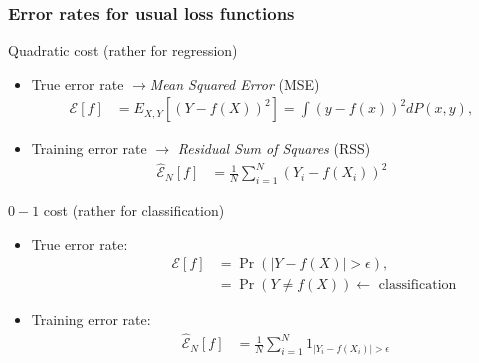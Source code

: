 \documentclass[compress, smaller, serif, 9pt]{beamer}
\begin{document}
\begin{frame}
  \frametitle{Error rates for usual loss functions}
  \begin{block}{Quadratic cost (rather for regression)}
   \begin{itemize}
   \item True error rate  $\rightarrow${\it Mean Squared Error} (MSE)
   \begin{align*}
    \mathcal{E}[f]&= E_{X,Y} \left[ \left(Y-f(X) \right)^2 \right]
    = \int  \left(y-f(x) \right)^2 dP(x,y),
   \end{align*}
   \item Training error rate  $\rightarrow$ {\it Residual Sum of Squares} (RSS)
   \begin{align*}
    \hat{\mathcal{E}}_N[f]&= \frac{1}{N} \sum_{i=1}^N \left(Y_i -f(X_i)\right)^2
   \end{align*}
   \end{itemize}
  \end{block}
  \begin{block}{$0-1$ cost (rather for classification)}
   \begin{itemize}
   \item  True error rate:
   \vspace{-6mm}
   \begin{align*}
                  \qquad  \qquad          \qquad    \mathcal{E}[f]& = \Pr\left( \left| Y-f(X) \right|> \epsilon  \right),\\
                              &=  \Pr\left(Y \ne f(X)\right) \leftarrow  \textrm{ classification}
                             \end{align*}
   \item Training error rate:
   \vspace{-9mm}
   \begin{align*} \qquad     
    \hat{\mathcal{E}}_N[f]&  = \frac{1}{N} \sum_{i=1}^N 1_{|Y_i -f(X_i)| > \epsilon}
    \end{align*}
   \end{itemize}
  \end{block}
\end{frame}
\end{document}
